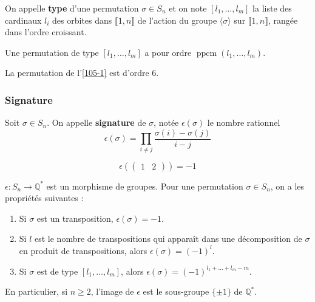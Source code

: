   \begin{definition}
    On appelle \textbf{type} d'une permutation $\sigma \in S_n$ et on note $[l_1, \dots, l_m]$ la liste des cardinaux $l_i$ des orbites dans $\llbracket 1, n \rrbracket$ de l'action du groupe $\langle \sigma \rangle$ sur $\llbracket 1, n \rrbracket$, rangée dans l'ordre croissant.
  \end{definition}

  \begin{proposition}
    Une permutation de type $[l_1, \dots, l_m]$ a pour ordre $\operatorname{ppcm}(l_1, \dots, l_m)$.
  \end{proposition}

  \begin{example}
    La permutation de l'\cref{105-1} est d'ordre $6$.
  \end{example}

  \subsubsection{Signature}

  \begin{definition}
    Soit $\sigma \in S_n$. On appelle \textbf{signature} de $\sigma$, notée $\epsilon(\sigma)$ le nombre rationnel
    \[ \epsilon(\sigma) = \prod_{i \neq j} \frac{\sigma(i) - \sigma(j)}{i-j} \]
  \end{definition}

  \begin{example}
    \[ \epsilon(\begin{pmatrix} 1 & 2 \end{pmatrix}) = -1 \]
  \end{example}

  \begin{proposition}
    $\epsilon : S_n \rightarrow \mathbb{Q}^*$ est un morphisme de groupes. Pour une permutation $\sigma \in S_n$, on a les propriétés suivantes :
    \begin{enumerate}[label={\bfseries(\roman*)}]
      \item Si $\sigma$ est un transposition, $\epsilon(\sigma) = -1$.
      \item Si $l$ est le nombre de transpositions qui apparaît dans une décomposition de $\sigma$ en produit de transpositions, alors $\epsilon(\sigma) = (-1)^l$.
      \item Si $\sigma$ est de type $[l_1, \dots, l_m]$, alors $\epsilon(\sigma) = (-1)^{l_1 + \dots + l_m - m}$.
    \end{enumerate}
    En particulier, si $n \geq 2$, l'image de $\epsilon$ est le sous-groupe $\{ \pm 1 \}$ de $\mathbb{Q}^*$.
  \end{proposition}

